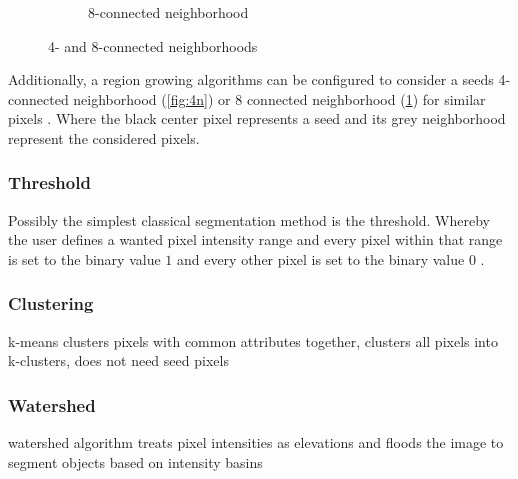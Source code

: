 \begin{figure}[h!]
\begin{subfigure}{0.49\textwidth}
{}
		\caption{8-connected neighborhood}\label{fig:8n}
	\end{subfigure}
	\caption{4- and 8-connected neighborhoods}\label{fig:neighborhoods}
\end{figure}
\noindent
Additionally, a region growing algorithms can be configured to consider a seeds 4-connected neighborhood
(\cref{fig:4n}) or 8 connected neighborhood (\cref{fig:8n}) for similar pixels \cite{jourlinVariousContrastConcepts2016,palReviewImageSegmentation1993}.
Where the black center pixel represents a seed and its grey neighborhood represent the considered pixels.
\pagebreak

\subsubsection{Threshold}
Possibly the simplest classical segmentation method is the threshold.
Whereby the user defines a wanted pixel intensity range and every pixel within that range is set to the binary value $1$ 
and every other pixel is set to the binary value $0$ \cite{sankurSurveyImageThresholding2004}.

\subsubsection{Clustering}
k-means clusters pixels with common attributes together,
clusters all pixels into k-clusters, does not need seed pixels

\subsubsection{Watershed}
watershed algorithm treats pixel intensities as elevations and floods the image to segment objects based on intensity basins
\cite{preimImageAnalysisMedical2014}

